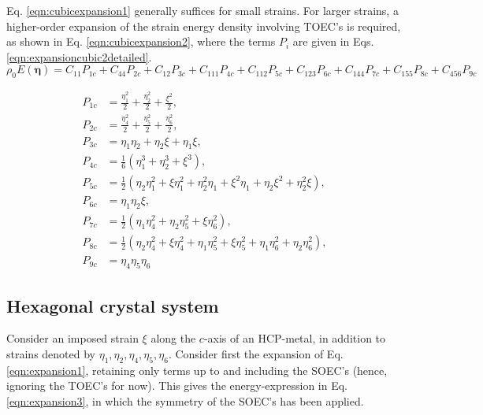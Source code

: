 \documentclass[showpacs,aps,floatfix,prb,reprint,superscriptaddress,onecolumn]{revtex4-1}
\begin{document}
Eq. \ref{eqn:cubicexpansion1} generally suffices for small strains. For larger strains, a higher-order expansion of the strain energy density involving TOEC's is required, as shown in Eq. \ref{eqn:cubicexpansion2}, where the terms $P_{i}$ are given in Eqs. \ref{eqn:expansioncubic2detailed}.  
\begin{equation}
\label{eqn:cubicexpansion2} 
\rho_{0} E \left(\bm{\eta}\right) = C_{11}P_{1c} + C_{44}P_{2c} + C_{12}P_{3c} +  C_{111}P_{4c} + C_{112}P_{5c} + C_{123}P_{6c} + C_{144}P_{7c} + C_{155}P_{8c} + C_{456}P_{9c}
\end{equation}

\begin{subequations}
\label{eqn:expansioncubic2detailed} 
\begin{align}
        P_{1c} &=\frac{\eta_{1}^2}{2}  + \frac{\eta_{2}^2}{2} + \frac{\xi^2}{2} ,\\
        P_{2c} &=\frac{\eta_{4}^2}{2} + \frac{\eta_{5}^2}{2} + \frac{\eta_{6}^2}{2} ,\\
				P_{3c} &=\eta_{1}\eta_{2} + \eta_{2}\xi + \eta_{1}\xi,\\
				P_{4c} &=\frac{1}{6} \left(\eta_{1}^{3}+\eta_{2}^{3}+\xi^{3} \right) ,\\
				P_{5c} &=\frac{1}{2} \left(\eta_{2}\eta_{1}^{2} + \xi\eta_{1}^{2} + \eta_{2}^{2}\eta_{1} + \xi^{2}\eta_{1} + \eta_{2}\xi^{2} + \eta_{2}^{2}\xi \right)  ,\\
				P_{6c} &=\eta_{1}\eta_{2}\xi  ,\\
				P_{7c} &=\frac{1}{2} \left(\eta_{1}\eta_{4}^2 + \eta_{2}\eta_{5}^{2} + \xi\eta_{6}^{2}\right)  ,\\
				P_{8c} &=\frac{1}{2} \left(\eta_{2}\eta_{4}^2 + \xi\eta_{4}^{2} + \eta_{1}\eta_{5}^{2} + \xi\eta_{5}^{2}  + \eta_{1}\eta_{6}^{2}  +  \eta_{2}\eta_{6}^{2} \right) ,\\
				P_{9c} &=\eta_{4}\eta_{5}\eta_{6}  
\end{align}
\end{subequations}









\subsection{Hexagonal crystal system}
Consider an imposed strain $\xi$ along the $c$-axis of an HCP-metal, in addition to strains denoted by $\eta_1, \eta_2, \eta_4, \eta_5, \eta_6$. Consider first the expansion of Eq. \ref{eqn:expansion1}, retaining only terms up to and including the SOEC's (hence, ignoring the TOEC's for now). This gives the energy-expression in Eq. \ref{eqn:expansion3}, in which the symmetry of the SOEC's has been applied. 
\end{document}
